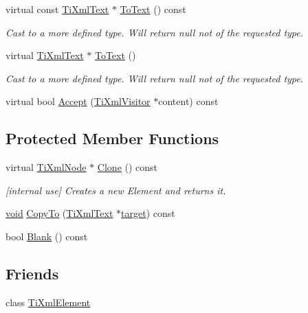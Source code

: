 \begin{DoxyCompactItemize}
virtual const \hyperlink{class_ti_xml_text}{Ti\-Xml\-Text} $\ast$ \hyperlink{class_ti_xml_text_a895bf34ffad17f7439ab2a52b9651648}{To\-Text} () const 
\begin{DoxyCompactList}\small\item\em Cast to a more defined type. Will return null not of the requested type. \end{DoxyCompactList}\item 
virtual \hyperlink{class_ti_xml_text}{Ti\-Xml\-Text} $\ast$ \hyperlink{class_ti_xml_text_ae7c3a8fd3e4dbf6c0c4363a943d72f5b}{To\-Text} ()
\begin{DoxyCompactList}\small\item\em Cast to a more defined type. Will return null not of the requested type. \end{DoxyCompactList}\item 
virtual bool \hyperlink{class_ti_xml_text_a8483d4415ce9de6c4fa8f63d067d5de6}{Accept} (\hyperlink{class_ti_xml_visitor}{Ti\-Xml\-Visitor} $\ast$content) const 
\end{DoxyCompactItemize}
\subsection*{Protected Member Functions}
\begin{DoxyCompactItemize}
\item 
virtual \hyperlink{class_ti_xml_node}{Ti\-Xml\-Node} $\ast$ \hyperlink{class_ti_xml_text_a0c411e93a27537369479d034cc82da3b}{Clone} () const 
\begin{DoxyCompactList}\small\item\em \mbox{[}internal use\mbox{]} Creates a new Element and returns it. \end{DoxyCompactList}\item 
\hyperlink{wglew_8h_aeea6e3dfae3acf232096f57d2d57f084}{void} \hyperlink{class_ti_xml_text_adcec7d9b6fccfc5777452bb97e6031c1}{Copy\-To} (\hyperlink{class_ti_xml_text}{Ti\-Xml\-Text} $\ast$\hyperlink{glew_8h_aa43eab0fe80422366a4602998d53b133}{target}) const 
\item 
bool \hyperlink{class_ti_xml_text_a1c120428e3b3cf24d79706e6d2b65aa6}{Blank} () const 
\end{DoxyCompactItemize}
\subsection*{Friends}
\begin{DoxyCompactItemize}
\item 
class \hyperlink{class_ti_xml_text_ab6592e32cb9132be517cc12a70564c4b}{Ti\-Xml\-Element}
\end{DoxyCompactItemize}
